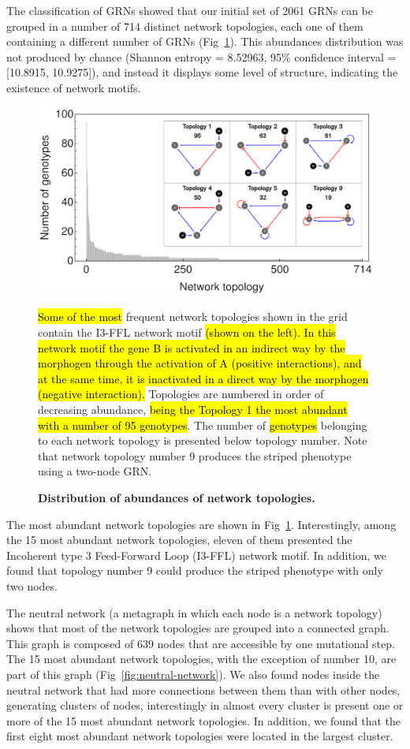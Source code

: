 \documentclass[10pt,letterpaper]{article}
\newcommand{\hil}[1]{\hl{#1}} %
\begin{document}
The classification of GRNs showed that our initial set of 2061 GRNs can be
grouped in a number of 714 distinct network topologies, each one of them
containing a different number of GRNs (Fig~\ref{fig:distopol}). This abundances
distribution was not produced by chance (Shannon entropy = 8.52963, 95\%
confidence interval = [10.8915, 10.9275]), and instead it displays some level
of structure, indicating the existence of network motifs.

\begin{figure}[!h]
 \includegraphics[width=\textwidth]{figures/results/Fig2}
 \caption{\bf Distribution of abundances of network topologies.}
 \hil{Some of the most} frequent network topologies shown in the grid
 contain the I3-FFL network motif \hil{(shown on the left). In this network
 motif the gene B is activated in an indirect way by the morphogen through
 the activation of A (positive interactions), and at the same time, it
 is inactivated in a direct way by the morphogen (negative interaction).}
 Topologies are numbered in order of decreasing abundance, \hil{being the
 Topology 1 the most abundant with a number of 95 genotypes}. The number of
 \hil{genotypes} belonging to each network topology is presented below
 topology number.
 Note that network topology number 9 produces the striped phenotype using a
 two-node GRN.
 \label{fig:distopol}
\end{figure}

The most abundant network topologies are shown in Fig~\ref{fig:distopol}.
Interestingly, among the 15 most abundant network topologies, eleven of them
presented the Incoherent type 3 Feed-Forward Loop (I3-FFL) network motif. In
addition, we found that topology number 9 could produce the striped phenotype
with only two nodes.

The neutral network (a metagraph in which each node is a network topology)
shows that most of the network topologies are grouped into a connected graph.
This graph is composed of 639 nodes that are accessible by one mutational step.
The 15 most abundant network topologies, with the exception of
number 10, are part of this graph (Fig~\ref{fig:neutral-network}). We also
found nodes inside the neutral network that had more connections between them
than with other nodes, generating clusters of nodes, interestingly in
almost every cluster is present one or more of the 15 most abundant network
topologies. In addition, we found that the first eight most abundant network
topologies were located in the largest cluster.
\end{document}
